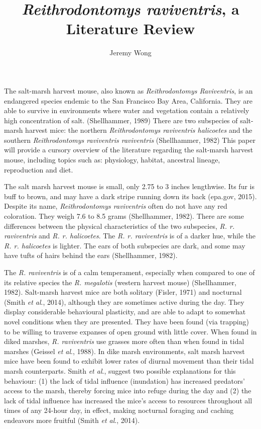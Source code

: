 \documentclass[a4paper]{article}
\author{Jeremy Wong}
\title{\textit{Reithrodontomys raviventris}, a Literature Review}
\begin{document}
\maketitle

The salt-marsh harvest mouse, also known as \textit{Reithrodontomys Raviventris}, is an endangered species endemic to the San Francisco Bay Area, California. They are able to survive in environments where water and vegetation contain a relatively high concentration of salt. (Shellhammer, 1989) There are two subspecies of salt-marsh harvest mice: the northern \textit{Reithrodontomys raviventris halicoetes} and the southern \textit{Reithrodontomys raviventris raviventris} (Shellhammer, 1982) This paper will provide a cursory overview of the literature regarding the salt-marsh harvest mouse, including topics such as: physiology, habitat, ancestral lineage, reproduction and diet.

The salt marsh harvest mouse is small, only 2.75 to 3 inches lengthwise. Its fur is buff to brown, and may have a dark stripe running down its back (epa.gov, 2015). Despite its name, \textit{Reithrodontomys raviventris} often do not have any red coloration. They weigh 7.6 to 8.5 grams (Shellhammer, 1982). There are some differences between the physical characteristics of the two subspecies, \textit{R. r. raviventris} and \textit{R. r. halicoetes}. The \textit{R. r. raviventris} is of a darker hue, while the \textit{R. r. halicoetes} is lighter. The ears of both subspecies are dark, and some may have tufts of hairs behind the ears (Shellhammer, 1982).

The \textit{R. raviventris} is of a calm temperament, especially when compared to one of its relative species the \textit{R. megalotis} (western harvest mouse) (Shellhammer, 1982). Salt-marsh harvest mice are both solitary (Fisler, 1971) and nocturnal (Smith \textit{et al}., 2014), although they are sometimes active during the day. They display considerable behavioural plasticity, and are able to adapt to somewhat novel conditions when they are presented. They have been found (via trapping) to be willing to traverse expanses of open ground with little cover. When found in diked marshes, \textit{R. raviventris} use grasses more often than when found in tidal marshes (Geissel \textit{et al}., 1988). In dike marsh environments, salt marsh harvest mice have been found to exhibit lower rates of diurnal movement than their tidal marsh counterparts. Smith \textit{et al}., suggest two possible explanations for this behaviour: (1) the lack of tidal influence (inundation) has increased predators' access to the marsh, thereby forcing mice into refuge during the day and (2) the lack of tidal influence has increased the mice's access to resources throughout all times of any 24-hour day, in effect, making nocturnal foraging and caching endeavors more fruitful (Smith \textit{et al}., 2014).
\end{document}
